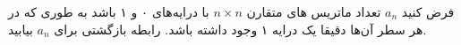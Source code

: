 \p    
    فرض کنید $a_n$ تعداد ماتریس های متقارن $n \times n$ با درایه‌های ۰ و ۱ باشد به طوری که در هر سطر آن‌ها دقیقا یک درایه ۱ وجود داشته باشد. رابطه بازگشتی برای $a_n$ بیابید.

